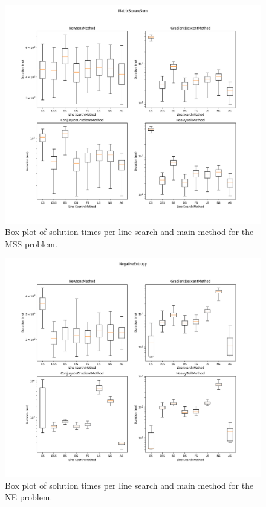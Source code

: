 \documentclass[english, 12pt, a4paper, sci, utf8, a-1b, online, table]{aaltothesis}
\begin{document}
\begin{figure}[H]
	\centering
	\includegraphics[width=1.0\textwidth]{images/boxplot_mss.png}
	\caption{Box plot of solution times per line search and main method for the MSS problem.}
	\label{fig:boxplot_mss}
\end{figure}


\begin{figure}[H]
	\centering
	\includegraphics[width=1.0\textwidth]{images/boxplot_ne.png}
	\caption{Box plot of solution times per line search and main method for the NE problem.}
	\label{fig:boxplot_ne}
\end{figure}
\end{document}
